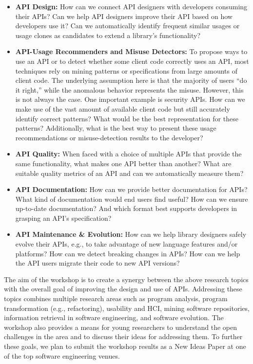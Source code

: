 \documentclass[10pt, conference]{IEEEtran}
\newcommand{\updated}[1]{#1}
\begin{document}
\begin{itemize}
\setlength\itemsep{5pt}

\item \textbf{API Design:} How can we connect API designers with developers consuming their APIs? Can we help API designers improve their API based on how developers use it? Can we automatically identify frequent similar usages or usage clones as candidates to extend a library's functionality?

\item \textbf{API-Usage Recommenders and Misuse Detectors:} To propose ways to use an API or to detect whether some client code correctly uses an API, most techniques rely on mining patterns or specifications from large amounts of client code. The underlying assumption here is that the majority of users ``do it right,'' while the anomalous behavior represents the misuse. However, this is not always the case. One important example is security APIs. How can we make use of the vast amount of available client code but still accurately identify correct patterns? What would be the best representation for these patterns? Additionally, what is the best way to present these usage recommendations or misuse-detection results to the developer? 

\item \textbf{API Quality:} When faced with a choice of multiple APIs that provide the same functionality, what makes one API better than another? What are suitable quality metrics of an API and can we automatically measure them?

\item\textbf{API Documentation:} How can we provide better documentation for APIs? What kind of documentation would end users find useful? How can we ensure up-to-date documentation? And which format best supports developers in grasping an API's specification?

\item \textbf{API Maintenance \& Evolution:} How can we help library designers safely evolve their APIs, e.g., to take advantage of new language features and/or platforms? How can we detect breaking changes in APIs? How can we help the API users migrate their code to new API versions?

\end{itemize}

The aim of the workshop is to create a synergy between the above research topics with the overall goal of improving the design and use of APIs. Addressing these topics combines multiple research areas such as program analysis, program transformation (e.g., refactoring), usability and HCI, mining software repositories, information retrieval in software engineering, and software evolution. The workshop also provides a means for young researchers to understand the open challenges in the area and to discuss their ideas for addressing them. \updated{To further these goals, we plan to submit the workshop results as a New Ideas Paper at one of the top software engineering venues.}
\end{document}
